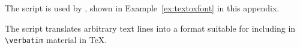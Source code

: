 \newpage

The  script is used by , shown
in Example~\ref{ex:textoxfont} in this appendix.  

\newpage

The  script translates arbitrary text lines into
a format suitable for including in \verb|\verbatim| material in \TeX.


\egroup